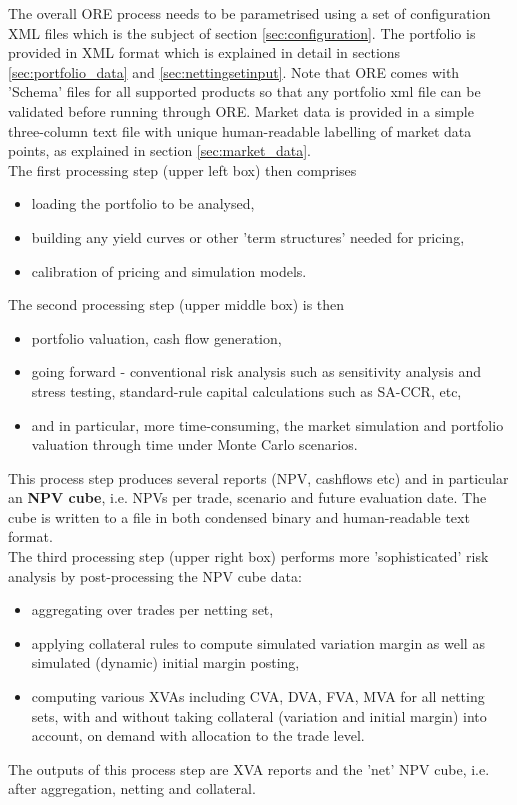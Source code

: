 \documentclass[12pt, a4paper]{article}
\begin{document}
The overall ORE process needs to be parametrised using a set of configuration XML files which is the subject of section
\ref{sec:configuration}. The portfolio is provided in XML format which is explained in detail in sections
\ref{sec:portfolio_data} and \ref{sec:nettingsetinput}. Note that ORE comes with 'Schema' files for all supported
products so that any portfolio xml file can be validated before running through ORE. Market data is provided in a simple
three-column text file with unique human-readable labelling of market data points, as explained in section
\ref{sec:market_data}.  \\

The first processing step (upper left box) then comprises 
\begin{itemize}
\item loading the portfolio to be analysed, 
\item building any yield curves or other 'term structures' needed for pricing, 
\item calibration of pricing and simulation models.
\end{itemize}

The second processing step (upper middle box) is then 
\begin{itemize}
\item portfolio valuation, cash flow generation,
\item going forward - conventional risk analysis such as sensitivity analysis and stress testing, standard-rule capital
  calculations such as SA-CCR, etc,
\item and in particular, more time-consuming, the market simulation and portfolio valuation through time under Monte
  Carlo scenarios.
\end{itemize}
This process step produces several reports (NPV, cashflows etc) and in particular an {\bf NPV cube}, i.e. NPVs per
trade, scenario and future evaluation date. The cube is written to a file in both condensed binary and human-readable
text format.  \\

The third processing step (upper right box) performs more 'sophisticated' risk ana\-ly\-sis by post-processing the NPV
cube data:
\begin{itemize}
\item aggregating over trades per netting set, 
\item applying collateral rules to compute simulated variation margin as well as simulated (dynamic) initial margin
  posting,
\item computing various XVAs including CVA, DVA, FVA, MVA for all netting sets, with and without taking collateral
  (variation and initial margin) into account, on demand with allocation to the trade level.
\end{itemize}
The outputs of this process step are XVA reports and the 'net' NPV cube, i.e. after aggregation, netting and collateral. \\
\end{document}
